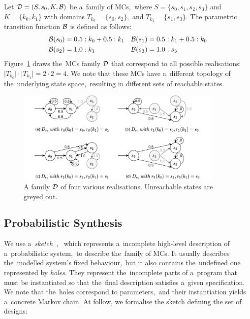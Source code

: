 \begin{example}\label{exam:mcfamily}
Let $\mathcal{D} = (S,s_{0},K,\mathcal{B})$ be a~family of MCs,~where $S = \{s_0, s_1, s_2, s_3\}$ and $K = \{ k_0, k_1\}$ with domains $T_{k_0} = \{s_0, s_2\}$,~and $T_{k_1} = \{s_1, s_3\}$.
The parametric transition function $\mathcal{B}$ is defined as follows:
\begin{align*}
    \mathcal{B}(s_0) &= 0.5 : k_0 + 0.5 : k_1  &  \mathcal{B}(s_1)  &= 0.5 : k_1  + 0.5 : k_0 \\
    \mathcal{B}(s_2) &= 1.0: k_1   &  \mathcal{B}(s_3)  &= 1.0 : s_3
\end{align*}
Figure~\ref{fig:mcfamily} draws the~MCs family $\mathcal{D}$ that correspond to all possible realisations: $\lvert T_{k_0} \rvert \cdot \lvert T_{k_1} \rvert = 2 \cdot 2 = 4$.
We note that these MCs have a~different topology of the~underlying state space,~resulting in different sets of reachable states.
\end{example}

\begin{figure}[ht!]
\centering
\includegraphics[width=0.9\textwidth]{figures/MCFamily.pdf}
\caption{A family $\mathcal{D}$ of four various realisations. Unreachable states are greyed out.}%
\label{fig:mcfamily}%
\end{figure}

\subsection{Probabilistic Synthesis}
We use a~\textit{sketch}~\cite{sketching1,sygus}, ~which represents a~incomplete high-level description of a~probabilistic system,~to describe the~family of MCs.
It usually describes the~modelled system's fixed behaviour,~but it also contains the~undefined one represented by \textit{holes}.
They represent the~incomplete parts of a~program that must be instantiated so that the~final description satisfies a~given specification.
We note that the~holes correspond to parameters,~and their instantiation yields a~concrete Markov chain.
At follow, we formalise the sketch defining the set of designs:

